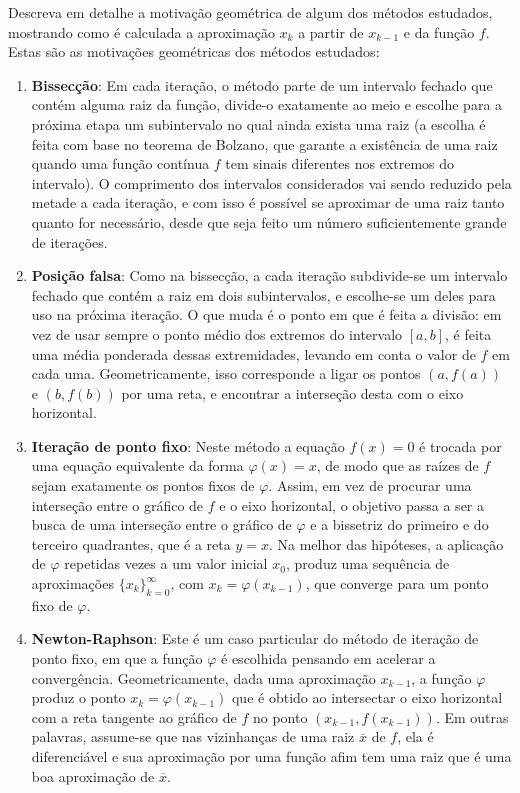 \documentclass[12pt,a4paper]{article}
\begin{document}
\begin{ExerciseList}

\Exercise[title={1,0}]
Descreva em detalhe a motivação geométrica de algum dos métodos estudados, mostrando como é calculada a aproximação $x_k$ a partir de $x_{k-1}$ e da função $f$.
\Answer
Estas são as motivações geométricas dos métodos estudados:
\begin{enumerate}
\item \textbf{Bissecção}: Em cada iteração, o método parte de um intervalo fechado que contém alguma raiz da função, divide-o exatamente ao meio e escolhe para a próxima etapa um subintervalo no qual ainda exista uma raiz (a escolha é feita com base no teorema de Bolzano, que garante a existência de uma raiz quando uma função contínua $f$ tem sinais diferentes nos extremos do intervalo). O comprimento dos intervalos considerados vai sendo reduzido pela metade a cada iteração, e com isso é possível se aproximar de uma raiz tanto quanto for necessário, desde que seja feito um número suficientemente grande de iterações.
\item \textbf{Posição falsa}: Como na bissecção, a cada iteração subdivide-se um intervalo fechado que contém a raiz em dois subintervalos, e escolhe-se um deles para uso na próxima iteração. O que muda é o ponto em que é feita a divisão: em vez de usar sempre o ponto médio dos extremos do intervalo $[a,b]$, é feita uma média ponderada dessas extremidades, levando em conta o valor de $f$ em cada uma. Geometricamente, isso corresponde a ligar os pontos $(a, f(a))$ e $(b, f(b))$ por uma reta, e encontrar a interseção desta com o eixo horizontal.
\item \textbf{Iteração de ponto fixo}: Neste método a equação $f(x) = 0$ é trocada por uma equação equivalente da forma $\varphi(x) = x$, de modo que as raízes de $f$ sejam exatamente os pontos fixos de $\varphi$. Assim, em vez de procurar uma interseção entre o gráfico de $f$ e o eixo horizontal, o objetivo passa a ser a busca de uma interseção entre o gráfico de $\varphi$ e a bissetriz do primeiro e do terceiro quadrantes, que é a reta $y = x$. Na melhor das hipóteses, a aplicação de $\varphi$ repetidas vezes a um valor inicial $x_0$, produz uma sequência de aproximações $\{ x_k \}_{k=0}^\infty$, com $x_k = \varphi( x_{k-1} )$, que converge para um ponto fixo de $\varphi$.
\item \textbf{Newton-Raphson}: Este é um caso particular do método de iteração de ponto fixo, em que a função $\varphi$ é escolhida pensando em acelerar a convergência. Geometricamente, dada uma aproximação $x_{k-1}$, a função $\varphi$ produz o ponto $x_k = \varphi( x_{k-1} )$ que é obtido ao intersectar o eixo horizontal com a reta tangente ao gráfico de $f$ no ponto $(x_{k-1}, f(x_{k-1}))$. Em outras palavras, assume-se que nas vizinhanças de uma raiz $\overline{x}$ de $f$, ela é diferenciável e sua aproximação por uma função afim tem uma raiz que é uma boa aproximação de $\overline{x}$.

\end{enumerate}
\end{ExerciseList}
\end{document}
